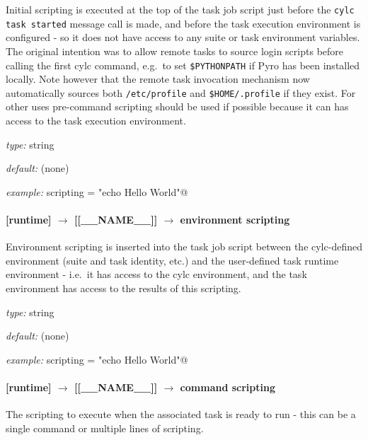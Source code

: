 Initial scripting is executed at the top of the task job script just
before the \lstinline=cylc task started= message call is made, and
before the task execution environment is configured - so it does not
have access to any suite or task environment variables.  The original
intention was to allow remote tasks to source login scripts before
calling the first cylc command, e.g.\ to set \lstinline=$PYTHONPATH= if
Pyro has been installed locally. Note however that the remote task
invocation mechanism now automatically sources both
\lstinline=/etc/profile= and \lstinline=$HOME/.profile= if they exist.
For other uses pre-command scripting should be used if possible because
it can has access to the task execution environment.
\begin{myitemize}
\item {\em type:} string
\item {\em default:} (none)
\item {\em example:} \lstinline@initial scripting = "echo Hello World"@
\end{myitemize}

\paragraph[environment scripting]{[runtime] $\rightarrow$ [[\_\_NAME\_\_]] $\rightarrow$ environment scripting}

Environment scripting is inserted into the task job script between
the cylc-defined environment (suite and task identity, etc.) and the
user-defined task runtime environment - i.e.\ it has access to the
cylc environment, and the task environment has access to the results of
this scripting.
\begin{myitemize}
\item {\em type:} string
\item {\em default:} (none)
\item {\em example:} \lstinline@environment scripting = "echo Hello World"@
\end{myitemize}

\paragraph[command scripting]{[runtime] $\rightarrow$ [[\_\_NAME\_\_]] $\rightarrow$ command scripting}

The scripting to execute when the associated task is ready to run - this
can be a single command or multiple lines of scripting.


